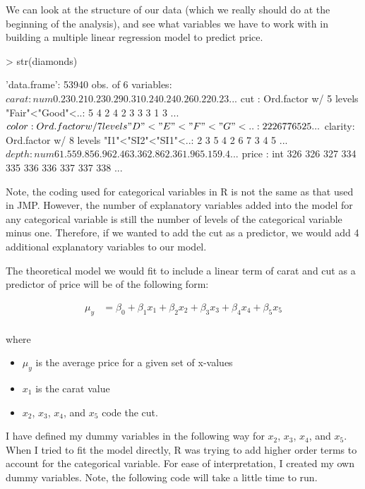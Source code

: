 \documentclass{article}
\begin{document}
We can look at the structure of our data (which we really should do at the beginning of the analysis), and see what variables we have to work with in building a multiple linear regression model to predict price.

\begin{Schunk}
\begin{Sinput}
> str(diamonds)
\end{Sinput}
\begin{Soutput}
'data.frame':	53940 obs. of  6 variables:
 $ carat  : num  0.23 0.21 0.23 0.29 0.31 0.24 0.24 0.26 0.22 0.23 ...
 $ cut    : Ord.factor w/ 5 levels "Fair"<"Good"<..: 5 4 2 4 2 3 3 3 1 3 ...
 $ color  : Ord.factor w/ 7 levels "D"<"E"<"F"<"G"<..: 2 2 2 6 7 7 6 5 2 5 ...
 $ clarity: Ord.factor w/ 8 levels "I1"<"SI2"<"SI1"<..: 2 3 5 4 2 6 7 3 4 5 ...
 $ depth  : num  61.5 59.8 56.9 62.4 63.3 62.8 62.3 61.9 65.1 59.4 ...
 $ price  : int  326 326 327 334 335 336 336 337 337 338 ...
\end{Soutput}
\end{Schunk}

Note, the coding used for categorical variables in R is not the same as that used in JMP.  However, the number of explanatory variables added into the model for any categorical variable is still the number of levels of the categorical variable minus one.  Therefore, if we wanted to add the cut as a predictor, we would add 4 additional explanatory variables to our model.

The theoretical model we would fit to include a linear term of carat and cut as a predictor of price will be of the following form:

\begin{eqnarray*}
\mu_y&=\beta_0 + \beta_1 x_1 + \beta_2 x_2 + \beta_3 x_3 + \beta_4 x_4 + \beta_5 x_5\\
\end{eqnarray*}

where 

\begin{itemize}
\item[] $\mu_y$ is the average price for a given set of x-values
\item[] $x_1$ is the carat value
\item[] $x_2$, $x_3$, $x_4$, and $x_5$ code the cut. 
\end{itemize}

I have defined my dummy variables in the following way for $x_2$, $x_3$, $x_4$, and $x_5$.  When I tried to fit the model directly, R was trying to add higher order terms to account for the categorical variable. For ease of interpretation, I created my own dummy variables. Note, the following code will take a little time to run.
\end{document}

